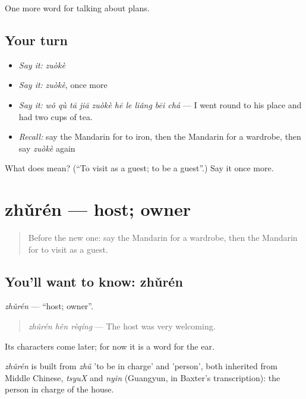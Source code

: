\begin{grammarlens}[title={What you've built}]
One more word for talking about plans.
\end{grammarlens}

\subsection*{Your turn}
\begin{itemize}
\raggedright
  \item \emph{Say it:} \emph{zuòkè}
  \item \emph{Say it:} \emph{zuòkè}, once more
  \item \emph{Say it:} \emph{wǒ qù tā jiā zuòkè hē le liǎng bēi chá} — I went round to his place and had two cups of tea.
  \item \emph{Recall:} say the Mandarin for to iron, then the Mandarin for a wardrobe, then say \emph{zuòkè} again
\end{itemize}

\begin{tcolorbox}[breakable,colback=teal!4,colframe=teal!35!black,title={Before you move on}]
What does  mean? (\textquotedblleft{}To visit as a guest; to be a guest\textquotedblright{}.) Say it once more.
\end{tcolorbox}
\section[zhǔrén]{zhǔrén — host; owner}

\label{lesson:ZH-C180-zhuren}



\begin{quote}
Before the new one: say the Mandarin for a wardrobe, then the Mandarin for to visit as a guest.
\end{quote}

\subsection*{You'll want to know: zhǔrén}
\emph{zhǔrén} — \textquotedblleft{}host; owner\textquotedblright{}.

\begin{quote}
\emph{zhǔrén hěn rèqíng} — The host was very welcoming.
\end{quote}

Its characters come later; for now it is a word for the ear.

\begin{cousinweb}
\emph{zhǔrén} is built from \emph{zhǔ} 'to be in charge' and  'person', both inherited from Middle Chinese, \emph{tsyuX} and \emph{nyin} (Guangyun, in Baxter's transcription): the person in charge of the house.
\end{cousinweb}

